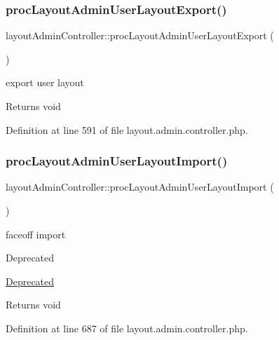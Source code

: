 \subsubsection{\texorpdfstring{proc\+Layout\+Admin\+User\+Layout\+Export()}{procLayoutAdminUserLayoutExport()}}
{\footnotesize\ttfamily layout\+Admin\+Controller\+::proc\+Layout\+Admin\+User\+Layout\+Export (\begin{DoxyParamCaption}{ }\end{DoxyParamCaption})}

export user layout \begin{DoxyReturn}{Returns}
void 
\end{DoxyReturn}


Definition at line 591 of file layout.\+admin.\+controller.\+php.

\hypertarget{classlayoutAdminController_a82cf560f92d64e4d76e90c969ebcda70}{}\label{classlayoutAdminController_a82cf560f92d64e4d76e90c969ebcda70} 
\subsubsection{\texorpdfstring{proc\+Layout\+Admin\+User\+Layout\+Import()}{procLayoutAdminUserLayoutImport()}}
{\footnotesize\ttfamily layout\+Admin\+Controller\+::proc\+Layout\+Admin\+User\+Layout\+Import (\begin{DoxyParamCaption}{ }\end{DoxyParamCaption})}

faceoff import \begin{DoxyRefDesc}{Deprecated}
\item[\hyperlink{deprecated__deprecated000017}{Deprecated}]\end{DoxyRefDesc}
\begin{DoxyReturn}{Returns}
void 
\end{DoxyReturn}


Definition at line 687 of file layout.\+admin.\+controller.\+php.

\hypertarget{classlayoutAdminController_a082aafb8b2911065e3bf5a025aa2be22}{}\label{classlayoutAdminController_a082aafb8b2911065e3bf5a025aa2be22} 

